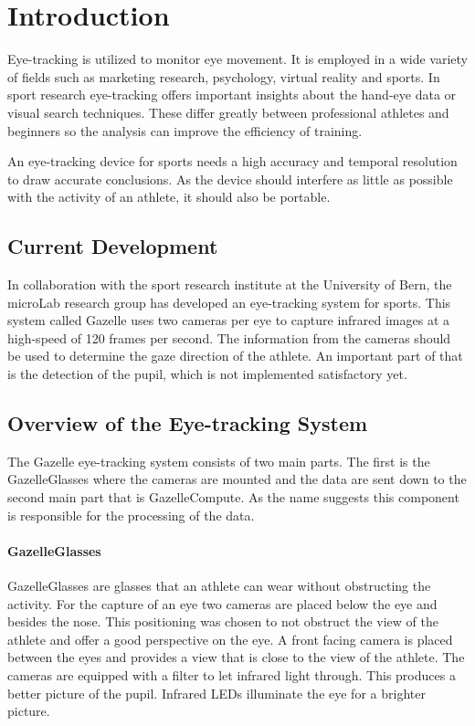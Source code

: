 \chapter{Introduction}

\label{chap:introduction}
Eye-tracking is utilized to monitor eye movement. It is employed in a wide variety of fields such as marketing research, psychology, virtual reality and sports. In sport research eye-tracking offers important insights about the hand-eye data or visual search techniques. These differ greatly between professional athletes and beginners so the analysis can improve the efficiency of training. 

An eye-tracking device for sports needs a high accuracy and temporal resolution to draw accurate conclusions. As the device should interfere as little as possible with the activity of an athlete, it should also be portable. 

\section{Current Development}
In collaboration with the sport research institute at the University of Bern, the microLab research group has developed an eye-tracking system for sports. This system called Gazelle uses two cameras per eye to capture infrared images at a high-speed of 120 frames per second. The information from the cameras should be used to determine the gaze direction of the athlete. An important part of that is the detection of the pupil, which is not implemented satisfactory yet.

\section{Overview of the Eye-tracking System}
The Gazelle eye-tracking system consists of two main parts. The first is the GazelleGlasses where the cameras are mounted and the data are sent down to the second main part that is GazelleCompute. As the name suggests this component is responsible for the processing of the data.

\subsubsection{GazelleGlasses}
GazelleGlasses are glasses that an athlete can wear without obstructing the activity.
For the capture of an eye two cameras are placed below the eye and besides the nose. This positioning was chosen to not obstruct the view of the athlete and offer a good perspective on the eye. A front facing camera is placed between the eyes and provides a view that is close to the view of the athlete. The cameras are equipped with a filter to let infrared light through. This produces a better picture of the pupil. Infrared LEDs illuminate the eye for a brighter picture.

